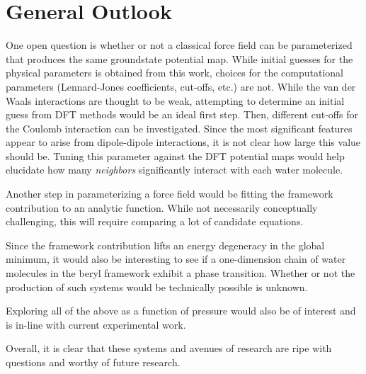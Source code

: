 \section{General Outlook}

One open question is whether or not a classical force field can be parameterized that produces the same groundstate potential map. While initial guesses for the physical parameters is obtained from this work, choices for the computational parameters (Lennard-Jones coefficients, cut-offs, etc.) are not. While the van der Waals interactions are thought to be weak, attempting to determine an initial guess from DFT methods would be an ideal first step. Then, different cut-offs for the Coulomb interaction can be investigated. Since the most significant features appear to arise from dipole-dipole interactions, it is not clear how large this value should be. Tuning this parameter against the DFT potential maps would help elucidate how many \textit{neighbors} significantly interact with each water molecule.

Another step in parameterizing a force field would be fitting the framework contribution to an analytic function. While not necessarily conceptually challenging, this will require comparing a lot of candidate equations.

Since the framework contribution lifts an energy degeneracy in the global minimum, it would also be interesting to see if a one-dimension chain of water molecules in the beryl framework exhibit a phase transition. Whether or not the production of such systems would be technically possible is unknown.

Exploring all of the above as a function of pressure would also be of interest and is in-line with current experimental work.

Overall, it is clear that these systems and avenues of research are ripe with questions and worthy of future research.
